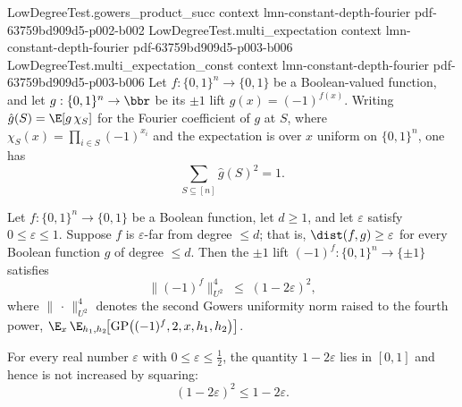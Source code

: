 \begin{lemma}
  {LowDegreeTest.gowers_product_succ}
  {context}
  {lmn-constant-depth-fourier}
  {pdf-63759bd909d5-p002-b002}
\proofstep
  {LowDegreeTest.multi_expectation}
  {context}
  {lmn-constant-depth-fourier}
  {pdf-63759bd909d5-p003-b006}
\proofstep
  {LowDegreeTest.multi_expectation_const}
  {context}
  {lmn-constant-depth-fourier}
  {pdf-63759bd909d5-p003-b006}
Let $f : \{0,1\}^n \to \{0,1\}$ be a Boolean-valued function, and let $g : \{0,1\}^n \to
\bbr$ be its $\pm 1$ lift $g(x) = (-1)^{f(x)}$. Writing $\hat g(S) = \E[g\,\chi_S]$ for
the Fourier coefficient of $g$ at $S$, where $\chi_S(x) = \prod_{i \in S}(-1)^{x_i}$ and
the expectation is over $x$ uniform on $\{0,1\}^n$, one has
\[
  \sum_{S \subseteq [n]} \hat g(S)^2 = 1.
\]
\end{lemma}

\begin{lemma}
\label{LowDegreeTest.gowers_U2_le_of_far}
\leanok
{}
Let $f : \{0,1\}^n \to \{0,1\}$ be a Boolean function, let $d \ge 1$, and let
$\varepsilon$ satisfy $0 \le \varepsilon \le 1$. Suppose $f$ is $\varepsilon$-far from
degree $\le d$; that is, $\dist(f,g) \ge \varepsilon$ for every Boolean function $g$ of
degree $\le d$. Then the $\pm 1$ lift $(-1)^f : \{0,1\}^n \to \{\pm 1\}$ satisfies \[
\bigl\lVert (-1)^f \bigr\rVert_{U^2}^{4} \;\le\; (1 - 2\varepsilon)^2, \] where
$\lVert\,\cdot\,\rVert_{U^2}^{4}$ denotes the second Gowers uniformity norm raised to
the fourth power,
$\E_{x}\,\E_{h_1,h_2}\!\bigl[\mathrm{GP}\bigl((-1)^f,2,x,h_1,h_2\bigr)\bigr]$.
\end{lemma}

\begin{lemma}
\label{LowDegreeTest.sq_one_sub_two_eps_le}
\leanok
{}
For every real number $\varepsilon$ with $0 \le \varepsilon \le \tfrac{1}{2}$, the
quantity $1 - 2\varepsilon$ lies in $[0,1]$ and hence is not increased by squaring:
\[
(1 - 2\varepsilon)^2 \le 1 - 2\varepsilon.
\]
\end{lemma}

